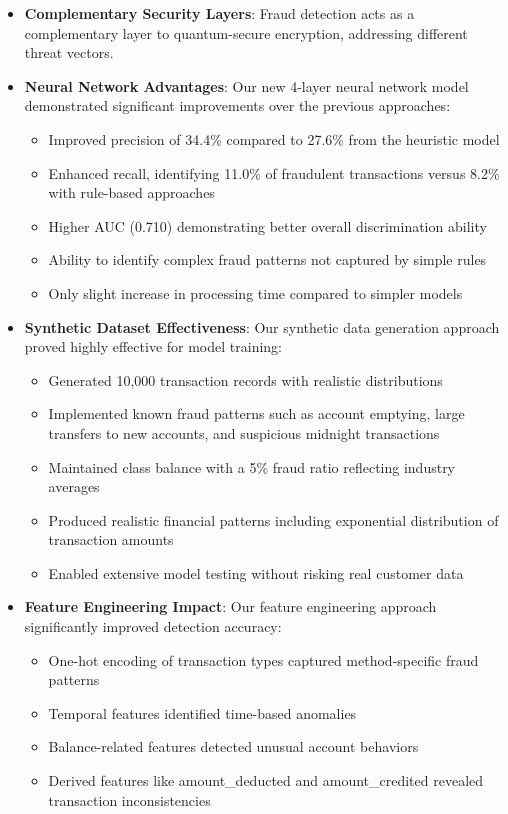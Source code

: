 \documentclass[onecolumn,a4paper,10pt]{IEEEtran}
\begin{document}
\begin{itemize}
    \item \textbf{Complementary Security Layers}: Fraud detection acts as a complementary layer to quantum-secure encryption, addressing different threat vectors.
    
    \item \textbf{Neural Network Advantages}: Our new 4-layer neural network model demonstrated significant improvements over the previous approaches:
    \begin{itemize}
        \item Improved precision of 34.4\% compared to 27.6\% from the heuristic model
        \item Enhanced recall, identifying 11.0\% of fraudulent transactions versus 8.2\% with rule-based approaches
        \item Higher AUC (0.710) demonstrating better overall discrimination ability
        \item Ability to identify complex fraud patterns not captured by simple rules
        \item Only slight increase in processing time compared to simpler models
    \end{itemize}
    
    \item \textbf{Synthetic Dataset Effectiveness}: Our synthetic data generation approach proved highly effective for model training:
    \begin{itemize}
        \item Generated 10,000 transaction records with realistic distributions
        \item Implemented known fraud patterns such as account emptying, large transfers to new accounts, and suspicious midnight transactions
        \item Maintained class balance with a 5\% fraud ratio reflecting industry averages
        \item Produced realistic financial patterns including exponential distribution of transaction amounts
        \item Enabled extensive model testing without risking real customer data
    \end{itemize}
    
    \item \textbf{Feature Engineering Impact}: Our feature engineering approach significantly improved detection accuracy:
    \begin{itemize}
        \item One-hot encoding of transaction types captured method-specific fraud patterns
        \item Temporal features identified time-based anomalies
        \item Balance-related features detected unusual account behaviors
        \item Derived features like amount\_deducted and amount\_credited revealed transaction inconsistencies
    \end{itemize}
    

\end{itemize}
\end{document}
